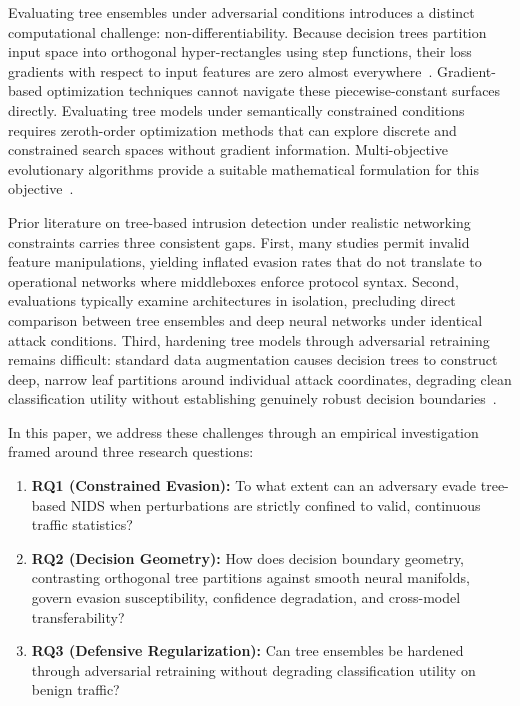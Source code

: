 \documentclass[final,5p,times,twocolumn]{elsarticle}
\begin{document}
Evaluating tree ensembles under adversarial conditions introduces a distinct computational challenge: non-differentiability. Because decision trees partition input space into orthogonal hyper-rectangles using step functions, their loss gradients with respect to input features are zero almost everywhere~\cite{kantchelian2016evasion,chen2019robust}. Gradient-based optimization techniques cannot navigate these piecewise-constant surfaces directly. Evaluating tree models under semantically constrained conditions requires zeroth-order optimization methods that can explore discrete and constrained search spaces without gradient information. Multi-objective evolutionary algorithms provide a suitable mathematical formulation for this objective~\cite{deb2002nsga,alhajjar2021adversarial}.

Prior literature on tree-based intrusion detection under realistic networking constraints carries three consistent gaps. First, many studies permit invalid feature manipulations, yielding inflated evasion rates that do not translate to operational networks where middleboxes enforce protocol syntax. Second, evaluations typically examine architectures in isolation, precluding direct comparison between tree ensembles and deep neural networks under identical attack conditions. Third, hardening tree models through adversarial retraining remains difficult: standard data augmentation causes decision trees to construct deep, narrow leaf partitions around individual attack coordinates, degrading clean classification utility without establishing genuinely robust decision boundaries~\cite{tramer2020adaptive}.

In this paper, we address these challenges through an empirical investigation framed around three research questions:
\begin{enumerate}
    \item \textbf{RQ1 (Constrained Evasion):} To what extent can an adversary evade tree-based NIDS when perturbations are strictly confined to valid, continuous traffic statistics?
    \item \textbf{RQ2 (Decision Geometry):} How does decision boundary geometry, contrasting orthogonal tree partitions against smooth neural manifolds, govern evasion susceptibility, confidence degradation, and cross-model transferability?
    \item \textbf{RQ3 (Defensive Regularization):} Can tree ensembles be hardened through adversarial retraining without degrading classification utility on benign traffic?
\end{enumerate}
\end{document}
